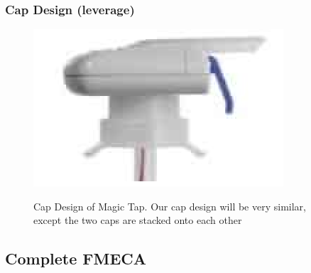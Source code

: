 \documentclass[12pt]{article}
\begin{document}
		\subsubsection*{Cap Design (leverage)}
		\begin{figure}[H]
			\centering
			\includegraphics{magictap.png}
			\label{fig:tap}
			\caption{Cap Design of Magic Tap. Our cap design will be very similar, except the two caps are stacked onto each other}
		\end{figure}
		\subsection*{Complete FMECA}
\end{document}
